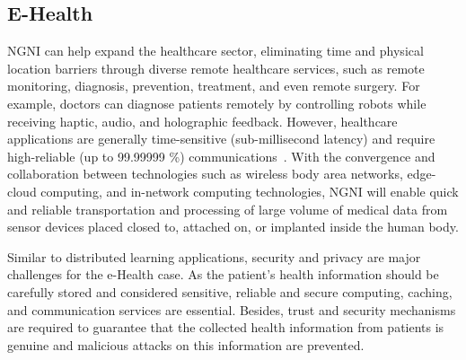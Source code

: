  \subsection{E-Health}
 
\noindent NGNI can help expand the healthcare sector, eliminating time and physical location barriers through diverse remote healthcare services, such as remote monitoring, diagnosis, prevention, treatment, and even remote surgery. For example, doctors can diagnose patients remotely by controlling robots while receiving haptic, audio, and holographic feedback. However, healthcare applications are generally time-sensitive (sub-millisecond latency) and require high-reliable (up to 99.99999 \%) communications~\cite{9040264}. 
With the convergence and collaboration between technologies such as wireless body area networks, edge-cloud computing, and in-network computing technologies, NGNI will enable quick and reliable transportation and processing of large volume of medical data from sensor devices placed closed to, attached on, or implanted inside the human body. 

Similar to distributed learning applications, security and privacy are major challenges for the e-Health case. As the patient’s health information should be carefully stored and considered sensitive, reliable and secure computing, caching, and communication services are essential. Besides, trust and security mechanisms are required to guarantee that the collected health information from patients is genuine and  malicious attacks on this information are prevented.
 

 

 
